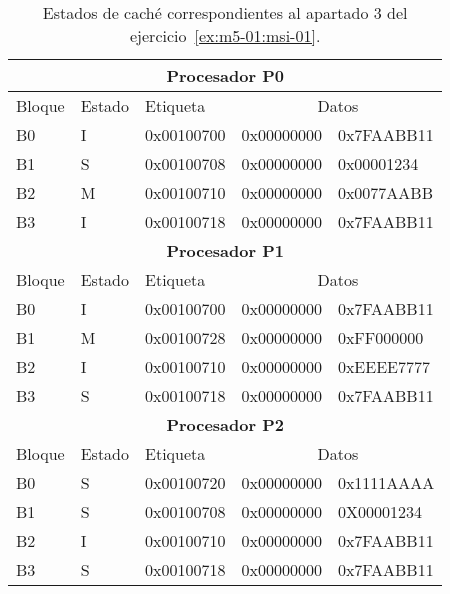 \begin{table}[htbp]

\begin{tabular}{|l|l|l|l|l|}

\hline
\multicolumn{5}{|c|}{\textbf{Procesador P0}}\\
\hline
Bloque & Estado & Etiqueta & \multicolumn{2}{c|}{Datos}\\
\hline
\hline

B0 & I & 0x00100700 & 0x00000000 & 0x7FAABB11\\
\hline
B1 & S & 0x00100708 & 0x00000000 & 0x00001234\\
\hline
B2 & M & 0x00100710 & 0x00000000 & 0x0077AABB\\
\hline
B3 & I & 0x00100718 & 0x00000000 & 0x7FAABB11\\
\hline

\hline
\multicolumn{5}{|c|}{\textbf{Procesador P1}}\\
\hline
Bloque & Estado & Etiqueta & \multicolumn{2}{c|}{Datos}\\
\hline
\hline

B0 & I & 0x00100700 & 0x00000000 & 0x7FAABB11\\
\hline
B1 & M & 0x00100728 & 0x00000000 & 0xFF000000\\
\hline
B2 & I & 0x00100710 & 0x00000000 & 0xEEEE7777\\
\hline
B3 & S & 0x00100718 & 0x00000000 & 0x7FAABB11\\
\hline


\hline
\multicolumn{5}{|c|}{\textbf{Procesador P2}}\\
\hline
Bloque & Estado & Etiqueta & \multicolumn{2}{c|}{Datos}\\
\hline
\hline

B0 & S & 0x00100720 & 0x00000000 & 0x1111AAAA\\
\hline
B1 & S & 0x00100708 & 0x00000000 & 0X00001234\\
\hline
B2 & I & 0x00100710 & 0x00000000 & 0x7FAABB11\\
\hline
B3 & S & 0x00100718 & {\color{red}0x00000000} & {\color{red}0x7FAABB11}\\
\hline

\end{tabular}

\caption{Estados de caché correspondientes al apartado 3 del ejercicio~\ref{ex:m5-01:msi-01}.}
\label{ex:m5-01:msi-01:tabl:3}

\end{table}

